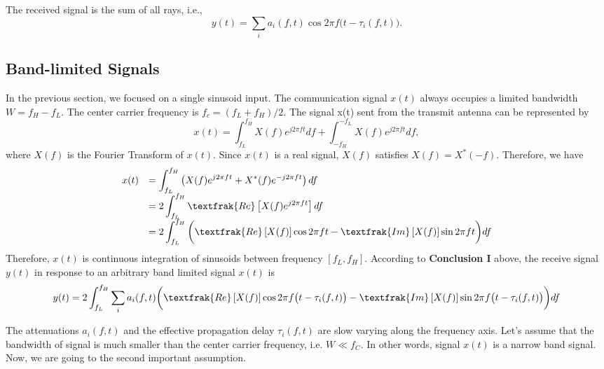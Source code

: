 \documentclass[letterpaper,11pt]{article}
\begin{document}
The received signal is the sum of all rays, i.e.,
\begin{equation}
y(t)=\displaystyle\sum_i a_i(f,t)\cos2\pi f\big(t-\tau_i(f, t)\big).
\end{equation}



\subsection{Band-limited Signals}

In the previous section, we focused on a single sinusoid input. The communication signal $x(t)$ always occupies a limited bandwidth $W=f_H-f_L$. The center carrier frequency is $f_c=(f_L+f_H)/2$. The signal x(t) sent from the transmit antenna can be represented by 
\begin{equation}
\displaystyle x(t)=\int_{f_L}^{f_H}X(f)e^{j2\pi ft}df+\int_{-f_H}^{-f_L}X(f)e^{j2\pi ft}df,
\end{equation}
where $X(f)$ is the Fourier Transform of $x(t)$. Since $x(t)$ is a real signal, $X(f)$ satisfies $X(f)=X^{*}(-f)$. Therefore, we have
\begin{equation}
\begin{array}{rl}
\displaystyle x(t)&=\displaystyle \int_{f_L}^{f_H}\left(X(f)e^{j2\pi ft}+X^{*}(f)e^{-j2\pi ft}\right)df\\
\displaystyle &=\displaystyle 2\int_{f_L}^{f_H}{\textfrak{Re}}\left[X(f)e^{j2\pi ft}\right]df\\
&=\displaystyle 2\int_{f_L}^{f_H}\bigg({\textfrak{Re}}\left[X(f)\right]\cos2\pi ft-{\textfrak{Im}}\left[X(f)\right]\sin2\pi ft\bigg)df\\
\end{array}
\end{equation}
Therefore, $x(t)$ is continuous integration of sinusoids between frequency $[f_L, f_H]$. According to \textbf{Conclusion I} above, the receive signal $y(t)$ in response to an arbitrary band limited signal $x(t)$ is 
\begin{equation}\label{frq_dependent}
y(t)=\displaystyle2\int_{f_L}^{f_H}\sum_ia_i(f,t)\bigg({\textfrak{Re}}\left[X(f)\right]\cos2\pi f\big(t-\tau_i(f,t)\big)-{\textfrak{Im}}\left[X(f)\right]\sin2\pi f\big(t-\tau_i(f,t)\big)\bigg)df
\end{equation}

The attenuations $a_i(f,t)$ and the effective propagation delay $\tau_i(f,t)$ are slow varying along the frequency axis. Let's assume  that the bandwidth of signal is much smaller than the center carrier frequency, i.e. $W\ll f_C$. In other words, signal $x(t)$ is a narrow band signal. Now, we are going to the second important assumption. \\
\end{document}
